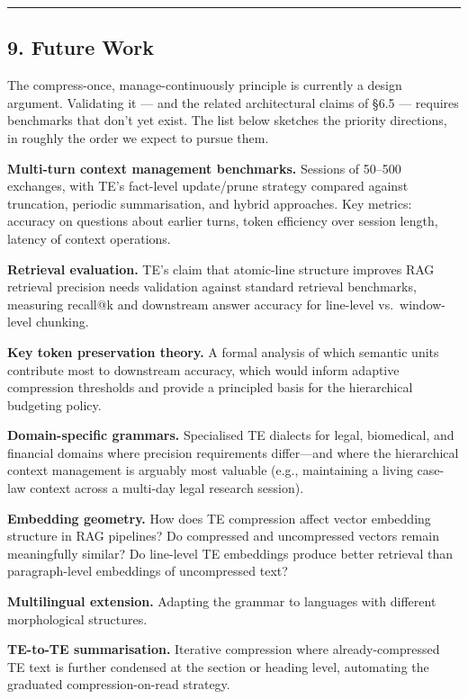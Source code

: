 \documentclass[
]{article}
\begin{document}
\begin{center}\rule{0.5\linewidth}{0.5pt}\end{center}

\subsection{9. Future Work}\label{future-work}

The compress-once, manage-continuously principle is currently a design
argument. Validating it --- and the related architectural claims of §6.5
--- requires benchmarks that don't yet exist. The list below sketches
the priority directions, in roughly the order we expect to pursue them.

\textbf{Multi-turn context management benchmarks.} Sessions of 50--500
exchanges, with TE's fact-level update/prune strategy compared against
truncation, periodic summarisation, and hybrid approaches. Key metrics:
accuracy on questions about earlier turns, token efficiency over session
length, latency of context operations.

\textbf{Retrieval evaluation.} TE's claim that atomic-line structure
improves RAG retrieval precision needs validation against standard
retrieval benchmarks, measuring recall@k and downstream answer accuracy
for line-level vs.~window-level chunking.

\textbf{Key token preservation theory.} A formal analysis of which
semantic units contribute most to downstream accuracy, which would
inform adaptive compression thresholds and provide a principled basis
for the hierarchical budgeting policy.

\textbf{Domain-specific grammars.} Specialised TE dialects for legal,
biomedical, and financial domains where precision requirements
differ---and where the hierarchical context management is arguably most
valuable (e.g., maintaining a living case-law context across a multi-day
legal research session).

\textbf{Embedding geometry.} How does TE compression affect vector
embedding structure in RAG pipelines? Do compressed and uncompressed
vectors remain meaningfully similar? Do line-level TE embeddings produce
better retrieval than paragraph-level embeddings of uncompressed text?

\textbf{Multilingual extension.} Adapting the grammar to languages with
different morphological structures.

\textbf{TE-to-TE summarisation.} Iterative compression where
already-compressed TE text is further condensed at the section or
heading level, automating the graduated compression-on-read strategy.
\end{document}
